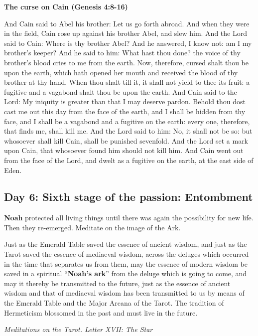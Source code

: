 \textbf{The curse on Cain (Genesis 4:8-16)}

And Cain said to Abel his brother: Let us go forth abroad. And when they were in the field, Cain rose up against his
brother Abel, and slew him. And the Lord said to Cain: Where is thy brother Abel? And he answered, I know not: am I my
brother's keeper? And he said to him: What hast thou done? the voice of thy
brother's blood cries to me from the earth. Now, therefore, cursed shalt thou be upon the earth,
which hath opened her mouth and received the blood of thy brother at thy hand. When thou shalt till it, it shall not
yield to thee its fruit: a fugitive and a vagabond shalt thou be upon the earth. And Cain said to the Lord: My iniquity
is greater than that I may deserve pardon. Behold thou dost cast me out this day from the face of the earth, and I
shall be hidden from thy face, and I shall be a vagabond and a fugitive on the earth: every one, therefore, that finds
me, shall kill me. And the Lord said to him: No, it shall not be so: but whosoever shall kill Cain, shall be punished
sevenfold. And the Lord set a mark upon Cain, that whosoever found him should not kill him. And Cain went out from the
face of the Lord, and dwelt as a fugitive on the earth, at the east side of Eden.

\subsection*{Day 6: Sixth stage of the passion: Entombment}
\textbf{Noah} protected all living things until there was again the possibility for new life. Then they re-emerged.
Meditate on the image of the Ark.

\begin{quotationx}
Just as the Emerald Table saved the essence of ancient wisdom, and just as the Tarot saved the essence of mediaeval
wisdom, across the deluges which occurred in the time that separates us from them, may the essence of modern wisdom be
saved in a spiritual “\textbf{Noah's ark}” from the deluge which is going to come, and may it
thereby be transmitted to the future, just as the essence of ancient wisdom and that of mediaeval wisdom has been
transmitted to us by means of the Emerald Table and the Major Arcana of the Tarot. The tradition of Hermeticism
blossomed in the past and must live in the future. \begin{flushright} \textit{Meditations on the Tarot. Letter XVII: The Star}\end{flushright}

\end{quotationx}

